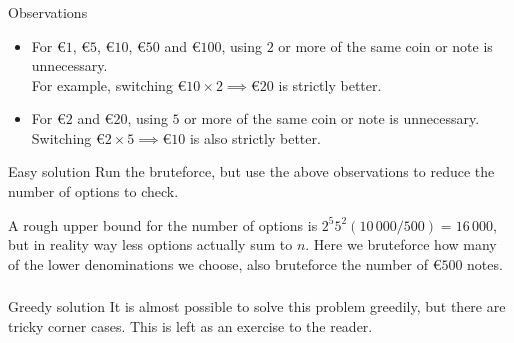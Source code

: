 \begin{frame}
    \frametitle{\problemtitle}
    \begin{block}{Observations}
    \begin{itemize}
        \item
            For €$1$, €$5$, €$10$, €$50$ and €$100$, using $2$ or more of the same coin or note is unnecessary. \\
            For example, switching $\text{€}10 \times 2 \implies \text{€}20$ is strictly better.
        \pause
        \item
            For €$2$ and €$20$, using $5$ or more of the same coin or note is unnecessary. \\
            Switching $\text{€}2 \times 5 \implies \text{€}10$ is also strictly better.
    \end{itemize}
    \end{block}
    \pause
    \begin{block}{Easy solution}
        Run the bruteforce, but use the above observations to reduce the number of options to check.

        A rough upper bound for the number of options is $2^5 5^2 (10\,000/500) = 16\,000$, but in reality way less options actually sum to $n$.
        Here we bruteforce how many of the lower denominations we choose, also bruteforce the number of €$500$ notes.
    \end{block}
\end{frame}

\begin{frame}
    \frametitle{\problemtitle}
    \begin{block}{Greedy solution}
        It is almost possible to solve this problem greedily, but there are tricky corner cases. This is left as an exercise to the reader.
    \end{block}
    \pause
    \solvestats
\end{frame}
